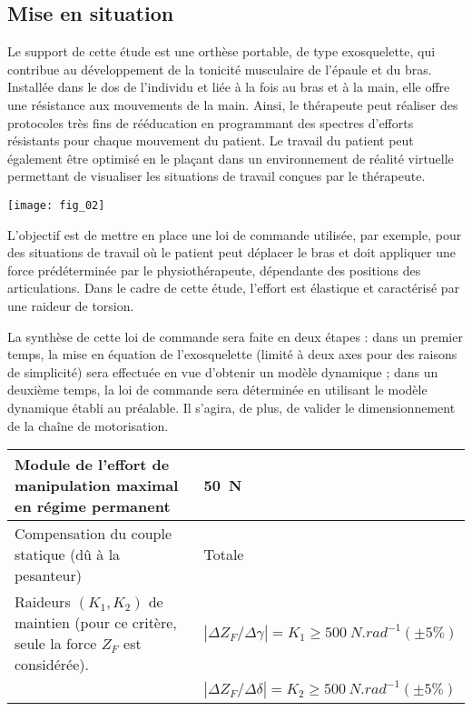\ifprof
\else

\ifprof
\else
\begin{multicols}{2}
\fi

\subsection*{Mise en situation}

Le support de cette étude est une orthèse portable, de type exosquelette, qui contribue au développement de la tonicité musculaire de l’épaule et du bras. Installée dans le dos de l’individu
et liée à la fois au bras et à la main, elle offre une résistance aux mouvements de la main. Ainsi, le thérapeute
peut réaliser des protocoles très fins de rééducation en programmant des spectres d’efforts résistants pour chaque
mouvement du patient. Le travail du patient peut également être optimisé en le plaçant dans un environnement
de réalité virtuelle permettant de visualiser les situations de travail conçues par le thérapeute.

\begin{center}
\texttt{[image: fig\_02]}
\end{center}
\begin{obj}
L’objectif est de mettre en place une loi de commande utilisée, par exemple, pour des
situations de travail où le patient peut déplacer le bras et doit appliquer une force prédéterminée par le
physiothérapeute, dépendante des positions des articulations. Dans le cadre de cette étude, l’effort est
élastique et caractérisé par une raideur de torsion. 
\end{obj}

La synthèse de cette loi de commande sera faite en
deux étapes : dans un premier temps, la mise en équation de l’exosquelette (limité à deux axes pour des
raisons de simplicité) sera effectuée en vue d’obtenir un modèle dynamique ; dans un deuxième temps,
la loi de commande sera déterminée en utilisant le modèle dynamique établi au préalable. Il s’agira, de
plus, de valider le dimensionnement de la chaîne de motorisation.

\footnotesize
\begin{center}
\begin{tabular}{|p{.45\linewidth}|p{.45\linewidth}|}
\hline 
Module de l'effort de manipulation maximal en régime permanent & \SI{50}{N} \\ \hline 
Compensation du couple statique (dû à la pesanteur) & Totale \\ \hline 
Raideurs $(K_1,K_2)$ de maintien (pour ce critère, seule la force $Z_F$ est
considérée). & $|\Delta Z_F/\Delta \gamma|=K_1\geq \SI{500}{N.rad^{-1}} (\pm 5\%)$ \\
& $|\Delta Z_F/\Delta \delta|=K_2\geq \SI{500}{N.rad^{-1}} (\pm 5\%)$ \\\hline 
\end{tabular}
\end{center}


\end{multicols}
